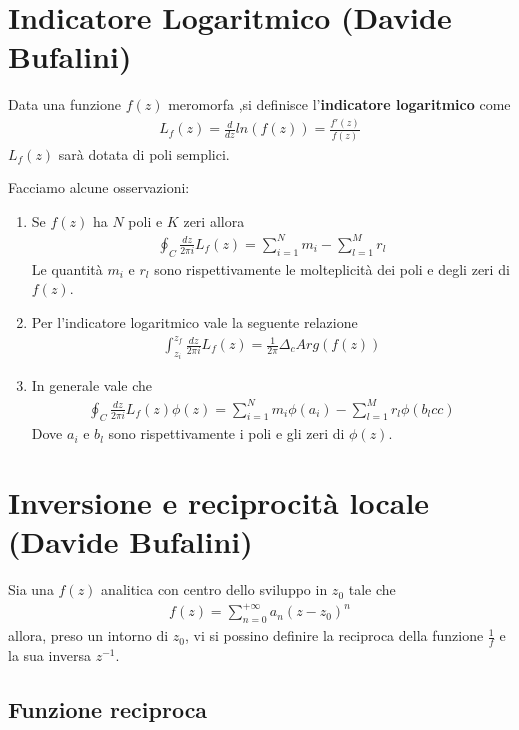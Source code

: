 \newpage

\section{Indicatore Logaritmico (Davide Bufalini)}
Data una funzione $f(z)$ meromorfa ,si definisce l'\textbf{indicatore logaritmico} come
\begin{align}
	L_f(z) = \frac{d}{dz}ln(f(z)) = \frac{f'(z)}{f(z)}
\end{align}
$L_f(z)$ sarà dotata di poli semplici.


Facciamo alcune osservazioni:
\begin{enumerate}
	\item Se $f(z)$ ha $N$ poli e $K$ zeri allora
	\begin{align}
		\oint_C \frac{dz}{2\pi i} L_f(z) = \sum_{i=1}^{N} m_i - \sum_{l=1}^{M}r_l
	\end{align}
	Le quantità $m_i$ e $r_l$ sono rispettivamente le molteplicità dei poli e degli zeri di $f(z)$.
	\item Per l'indicatore logaritmico vale la seguente relazione
	\begin{align}
		\int_{z_i}^{z_f}\frac{dz}{2\pi i} L_f(z) = \frac{1}{2\pi} \Delta_c Arg(f(z))
	\end{align}
	\item In generale vale che
	\begin{align}
		\oint_C \frac{dz}{2\pi i} L_f(z) \phi(z) = \sum_{i=1}^{N} m_i\phi(a_i) - \sum_{l=1}^{M}r_l\phi(b_lcc)
	\end{align}
	Dove $a_i$ e $b_l$ sono rispettivamente i poli e gli zeri di $\phi(z)$. 
\end{enumerate}

\newpage

\section{Inversione e reciprocità locale (Davide Bufalini)}

Sia una $f(z)$ analitica con centro dello sviluppo in $z_0$ tale che
\begin{align}
	f(z) = \sum_{n=0}^{+\infty} a_n (z-z_0)^n	\label{eq1}
\end{align}
allora, preso un intorno di $z_0$, vi si possino definire la reciproca della funzione $\frac{1}{f}$ e la sua inversa $z^{-1}$.

\subsection{Funzione reciproca}

